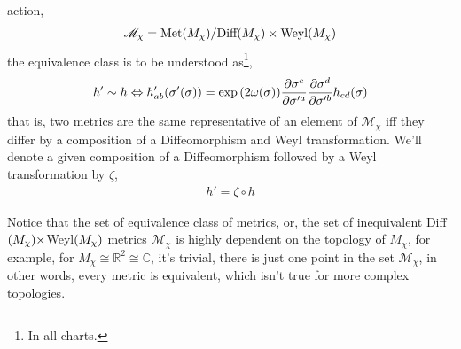 action,
\begin{align*}
    \mathscr{M}_\chi=\textnormal{Met}\qty(M_\chi)/\textnormal{Diff}\qty(M_\chi)\times\textnormal{Weyl}\qty(M_\chi)
\end{align*}
the equivalence class is to be understood as\footnote{In all charts.},
\begin{align*}
    h'\sim h\Leftrightarrow h'_{ab}\qty(\sigma'\qty(\sigma))=\exp\qty(2\omega\qty(\sigma))\pdv{ \sigma^c}{\sigma'^a}\pdv{ \sigma^d}{\sigma'^b} h_{cd}\qty( \sigma)
\end{align*}
that is, two metrics are the same representative of an element of $\mathscr M_\chi$ iff they differ by a composition of a Diffeomorphism and Weyl transformation. We'll denote a given composition of a Diffeomorphism followed by a Weyl transformation by $\zeta$,
\begin{align*}
    h'=\zeta\circ h
\end{align*}

Notice that the set of equivalence class of metrics, or, the set of inequivalent Diff$\qty(M_\chi)\times$Weyl$\qty(M_\chi)$ metrics $\mathscr M_\chi$ is highly 
dependent on the topology of $M_\chi$, for example, for $M_\chi\cong\mathbb R^2\cong\mathbb C$, it's trivial, there is just one point in the set $\mathscr M_\chi$, in other words, 
every metric is equivalent, which isn't true for more complex topologies.

